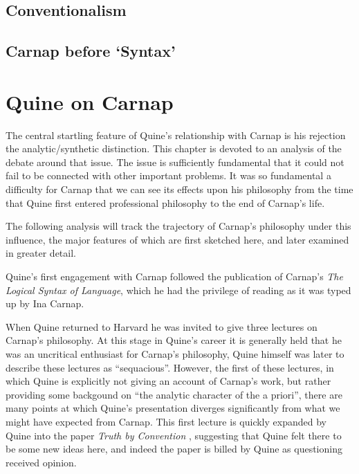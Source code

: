 \section{Conventionalism}

\section{Carnap before `Syntax'}

\chapter{Quine on Carnap}

\nocite{carnap56,carnap63,copi67,quine53,quine61, quine61a,quine66,quine86}

The central startling feature of Quine's relationship with
Carnap is his rejection the analytic/synthetic distinction.
This chapter is devoted to an analysis of the debate around
that issue.
The issue is sufficiently fundamental that it could not fail
to be connected with other important problems.
It was so fundamental a difficulty for Carnap that we can
see its effects upon his philosophy from the time that Quine
first entered professional philosophy to the end of Carnap's
life.

The following analysis will track the trajectory of Carnap's
philosophy under this influence, the major features of which
are first sketched here, and later examined in greater detail.

Quine's first engagement with Carnap followed the publication
of Carnap's {\it The Logical Syntax of Language}\cite{carnap37},
which he had the privilege of reading as it was typed up by
Ina Carnap.

When Quine returned to Harvard he was invited to give three
lectures on Carnap's philosophy.  
At this stage in Quine's career it is generally held that
he was an uncritical enthusiast for Carnap's philosophy,
Quine himself was later to describe these lectures as ``sequacious''.
However, the first of these lectures, in which Quine is explicitly
not giving an account of Carnap's work, but rather providing some
backgound on ``the analytic character of the a priori'', there
are many points at which Quine's presentation diverges significantly
from what we might have expected from Carnap.
This first lecture is quickly expanded by Quine into the paper
{\it Truth by Convention} \cite{quine36}, suggesting that Quine
felt there to be some new ideas here, and indeed the paper is
billed by Quine as questioning received opinion.


